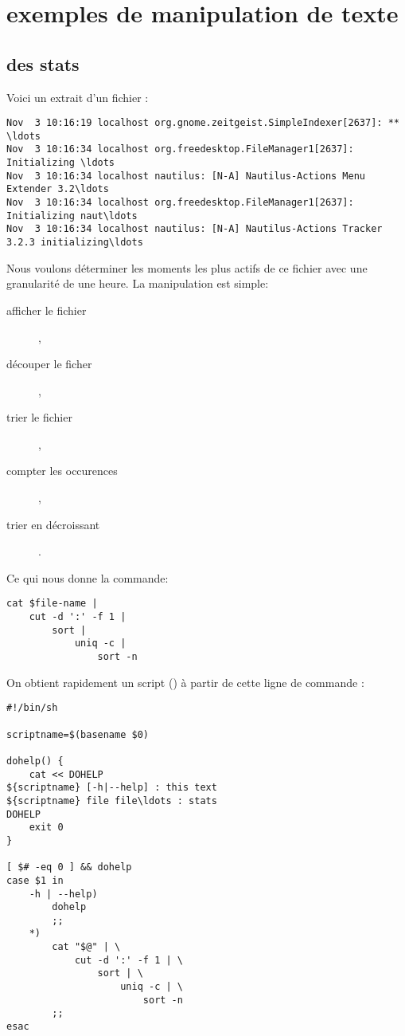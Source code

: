 
\section{exemples de manipulation de texte}

\subsection{des stats}
Voici un extrait d'un fichier :

\begin{lstlisting}
Nov  3 10:16:19 localhost org.gnome.zeitgeist.SimpleIndexer[2637]: ** \ldots
Nov  3 10:16:34 localhost org.freedesktop.FileManager1[2637]: Initializing \ldots
Nov  3 10:16:34 localhost nautilus: [N-A] Nautilus-Actions Menu Extender 3.2\ldots
Nov  3 10:16:34 localhost org.freedesktop.FileManager1[2637]: Initializing naut\ldots
Nov  3 10:16:34 localhost nautilus: [N-A] Nautilus-Actions Tracker 3.2.3 initializing\ldots
\end{lstlisting}

Nous voulons déterminer les moments les plus actifs de ce fichier avec une granularité de une heure.
La manipulation est simple:

\begin{description}
    \item[afficher le fichier] ,
    \item[découper le ficher] ,
    \item[trier le fichier] ,
    \item[compter les occurences] ,
    \item[trier en décroissant] .
\end{description}

Ce qui nous donne la commande:


\begin{lstlisting}
cat $file-name |
    cut -d ':' -f 1 |
        sort |
            uniq -c |
                sort -n
\end{lstlisting}

On obtient rapidement un script () à partir de cette ligne de commande :


\begin{lstlisting}
#!/bin/sh

scriptname=$(basename $0)

dohelp() {
    cat << DOHELP
${scriptname} [-h|--help] : this text
${scriptname} file file\ldots : stats
DOHELP
    exit 0
}

[ $# -eq 0 ] && dohelp
case $1 in
    -h | --help)
        dohelp
        ;;
    *)
        cat "$@" | \
            cut -d ':' -f 1 | \
                sort | \
                    uniq -c | \
                        sort -n
        ;;
esac
\end{lstlisting}

